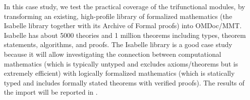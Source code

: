 \begin{workpackage}[id=dksbases,%
  title=Data/Knowledge/Software-Bases,lead=FAU,
  ZHRM=12,JURM=12,FAURM=34,UWRM=25,SARM=10,LLRM=2,PSRM=25]
\begin{tasklist}
\begin{task}[id=isabelle,title= Isabelle Case Study ,lead=FAU,PM=10,wphases={45-48!.6},issue=286]
In this case study, we test the practical coverage of the trifunctional modules, by 
transforming an existing, high-profile library of formalized mathematics (the Isabelle library
together with its Archive of Formal proofs) into OMDoc/MMT. Isabelle has about 5000 theories and 
1 million theorems including types, theorem statements, algorithms, and proofs. The Isabelle 
library is a good case study because it will allow investigating the connection between 
computational mathematics (which is typically untyped and excludes axioms/theorems but is 
extremely efficient) with logically formalized mathematics (which is statically typed and 
includes formally stated theorems with verified proofs). The results of the import will be 
reported in .
\end{task}

\end{tasklist}


\end{workpackage}
